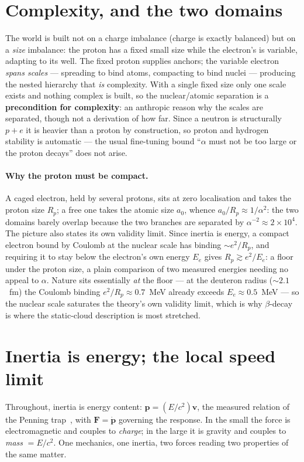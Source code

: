 \documentclass[11pt]{article}
\begin{document}
\section{Complexity, and the two domains}\label{sec:complexity}
The world is built not on a charge imbalance (charge is exactly balanced) but on a \emph{size} imbalance: the
proton has a fixed small size while the electron's is variable, adapting to its well. The fixed proton supplies
anchors; the variable electron \emph{spans scales} --- spreading to bind atoms, compacting to bind nuclei ---
producing the nested hierarchy that \emph{is} complexity. With a single fixed size only one scale exists and
nothing complex is built, so the nuclear/atomic separation is a \textbf{precondition for complexity}: an anthropic
reason why the scales are separated, though not a derivation of how far. Since a neutron is structurally $p+e$ it
is heavier than a proton by construction, so proton and hydrogen stability is automatic --- the usual fine-tuning
bound ``$\alpha$ must not be too large or the proton decays'' does not arise.

\paragraph{Why the proton must be compact.} A caged electron, held by several protons, sits at zero localisation
and takes the proton size $R_p$; a free one takes the atomic size $a_0$, whence $a_0/R_p\approx1/\alpha^2$: the two
domains barely overlap because the two branches are separated by $\alpha^{-2}\approx2\times10^4$. The picture also
states its own validity limit. Since inertia is energy, a compact electron bound by Coulomb at the nuclear scale
has binding ${\sim}e^2/R_p$, and requiring it to stay below the electron's own energy $E_e$ gives
$R_p\gtrsim e^2/E_e$: a floor under the proton size, a plain comparison of two measured energies needing no appeal
to $\alpha$. Nature sits essentially \emph{at} the floor --- at the deuteron radius (${\sim}2.1$~fm) the Coulomb
binding $e^2/R_p\approx0.7$~MeV already exceeds $E_e\approx0.5$~MeV --- so the nuclear scale saturates the theory's
own validity limit, which is why $\beta$-decay is where the static-cloud description is most stretched.

\section{Inertia is energy; the local speed limit}\label{sec:inertia}
Throughout, inertia is energy content: $\mathbf p=(E/c^2)\mathbf v$, the measured relation of the Penning
trap~\cite{nomass}, with $\mathbf F=\dot{\mathbf p}$ governing the response. In the small the force is
electromagnetic and couples to \emph{charge}; in the large it is gravity and couples to \emph{mass} $=E/c^2$. One
mechanics, one inertia, two forces reading two properties of the same matter.
\end{document}
